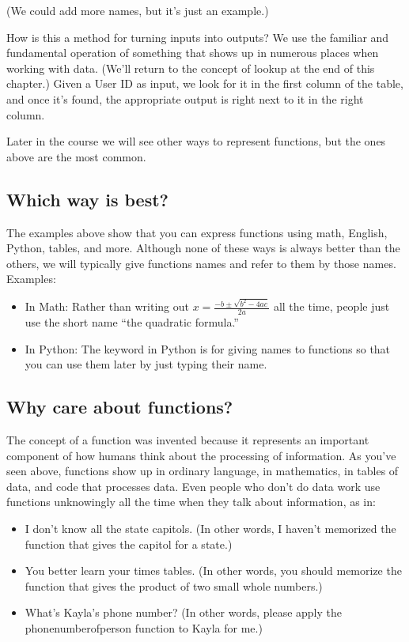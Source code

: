 \documentclass[letterpaper,10pt,english]{sphinxmanual}
\begin{document}
(We could add more names, but it’s just an example.)

How is this a method for turning inputs into outputs?  We use the familiar and fundamental operation of  something that shows up in numerous places when working with data.  (We’ll return to the concept of lookup at the end of this chapter.)  Given a User ID as input, we look for it in the first column of the table, and once it’s found, the appropriate output is right next to it in the right column.

 Later in the course we will see other ways to represent functions, but the ones above are the most common.


\subsection{Which way is best?}
\label{\detokenize{chapter-2-mathematical-foundations:which-way-is-best}}
The examples above show that you can express functions using math, English, Python, tables, and more.  Although none of these ways is always better than the others, we will typically give functions names and refer to them by those names.  Examples:
\begin{itemize}
\item {} 
In Math:  Rather than writing out \(x=\frac{-b\pm\sqrt{b^2-4ac}}{2a}\) all the time, people just use the short name “the quadratic formula.”

\item {} 
In Python:  The  keyword in Python is for giving names to functions so that you can use them later by just typing their name.

\end{itemize}


\subsection{Why care about functions?}
\label{\detokenize{chapter-2-mathematical-foundations:why-care-about-functions}}
The concept of a function was invented because it represents an important component of how humans think about the processing of information.  As you’ve seen above, functions show up in ordinary language, in mathematics, in tables of data, and code that processes data.  Even people who don’t do data work use functions unknowingly all the time when they talk about information, as in:
\begin{itemize}
\item {} 
I don’t know all the state capitols. (In other words, I haven’t memorized the function that gives the capitol for a state.)

\item {} 
You better learn your times tables. (In other words, you should memorize the function that gives the product of two small whole numbers.)

\item {} 
What’s Kayla’s phone number? (In other words, please apply the phone\sphinxhyphen{}number\sphinxhyphen{}of\sphinxhyphen{}person function to Kayla for me.)

\end{itemize}
\end{document}
